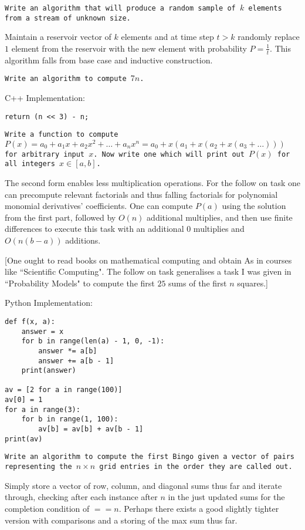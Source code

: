 \texttt{Write an algorithm that will produce a random sample of $k$ elements from a stream of unknown size.}

Maintain a reservoir vector of $k$ elements and at time step $t>k$ randomly replace $1$ element from the reservoir with the new element with probability $P=\frac{1}{t}$. This algorithm falls from base case and inductive construction.

\texttt{Write an algorithm to compute $7n$.}

C++ Implementation:

\begin{verbatim}
return (n << 3) - n;
\end{verbatim}

\texttt{Write a function to compute $P(x)=a_0+a_1 x+a_2 x^2 + \dots + a_n x^n=a_0+x(a_1+x(a_2+x(a_3+\dots)))$ for arbitrary input $x$. Now write one which will print out $P(x)$ for all integers $x \in [a,b]$.}

The second form enables less multiplication operations. For the follow on task one can precompute relevant factorials and thus falling factorials for polynomial monomial derivatives' coefficients. One can compute $P(a)$ using the solution from the first part, followed by $O(n)$ additional multiplies, and then use finite differences to execute this task with an additional $0$ multiplies and $O(n(b-a))$ additions.

[One ought to read books on mathematical computing and obtain As in courses like ``Scientific Computing". The follow on task generalises a task I was given in ``Probability Models" to compute the first $25$ sums of the first $n$ squares.]

Python Implementation:

\begin{verbatim}
def f(x, a):
    answer = x
    for b in range(len(a) - 1, 0, -1):
        answer *= a[b]
        answer += a[b - 1]
    print(answer)

av = [2 for a in range(100)]
av[0] = 1
for a in range(3):
    for b in range(1, 100):
        av[b] = av[b] + av[b - 1]
print(av)
\end{verbatim}

\texttt{Write an algorithm to compute the first Bingo given a vector of pairs representing the $n \times n$ grid entries in the order they are called out.}

Simply store a vector of row, column, and diagonal sums thus far and iterate through, checking after each instance after $n$ in the just updated sums for the completion condition of $==n$. Perhaps there exists a good slightly tighter version with comparisons and a storing of the max sum thus far.

